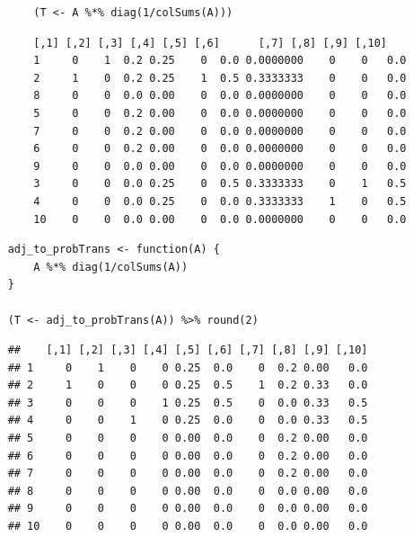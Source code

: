 \documentclass[11pt]{report}
\begin{document}
\begin{listing}[htbp]
    \begin{tcolorbox}
        \begin{verbatim}
        (T <- A %*% diag(1/colSums(A)))
        \end{verbatim}
        \caption{\label{basic-trans-def}Solve the Transition Probability Matrix by scaling each column to 1 using matrix multiplication.}
    \tcblower
        \begin{verbatim}
        [,1] [,2] [,3] [,4] [,5] [,6]      [,7] [,8] [,9] [,10]
        1     0    1  0.2 0.25    0  0.0 0.0000000    0    0   0.0
        2     1    0  0.2 0.25    1  0.5 0.3333333    0    0   0.0
        8     0    0  0.0 0.00    0  0.0 0.0000000    0    0   0.0
        5     0    0  0.2 0.00    0  0.0 0.0000000    0    0   0.0
        7     0    0  0.2 0.00    0  0.0 0.0000000    0    0   0.0
        6     0    0  0.2 0.00    0  0.0 0.0000000    0    0   0.0
        9     0    0  0.0 0.00    0  0.0 0.0000000    0    0   0.0
        3     0    0  0.0 0.25    0  0.5 0.3333333    0    1   0.5
        4     0    0  0.0 0.25    0  0.0 0.3333333    1    0   0.5
        10    0    0  0.0 0.00    0  0.0 0.0000000    0    0   0.0
        \end{verbatim}
    \end{tcolorbox}
\end{listing}





\begin{tcolorbox}
    \begin{verbatim}
    adj_to_probTrans <- function(A) {
        A %*% diag(1/colSums(A))
    }

    (T <- adj_to_probTrans(A)) %>% round(2)
    \end{verbatim}
\tcblower
    \begin{verbatim}
    ##    [,1] [,2] [,3] [,4] [,5] [,6] [,7] [,8] [,9] [,10]
    ## 1     0    1    0    0 0.25  0.0    0  0.2 0.00   0.0
    ## 2     1    0    0    0 0.25  0.5    1  0.2 0.33   0.0
    ## 3     0    0    0    1 0.25  0.5    0  0.0 0.33   0.5
    ## 4     0    0    1    0 0.25  0.0    0  0.0 0.33   0.5
    ## 5     0    0    0    0 0.00  0.0    0  0.2 0.00   0.0
    ## 6     0    0    0    0 0.00  0.0    0  0.2 0.00   0.0
    ## 7     0    0    0    0 0.00  0.0    0  0.2 0.00   0.0
    ## 8     0    0    0    0 0.00  0.0    0  0.0 0.00   0.0
    ## 9     0    0    0    0 0.00  0.0    0  0.0 0.00   0.0
    ## 10    0    0    0    0 0.00  0.0    0  0.0 0.00   0.0
    \end{verbatim}
\end{tcolorbox}
\end{document}
